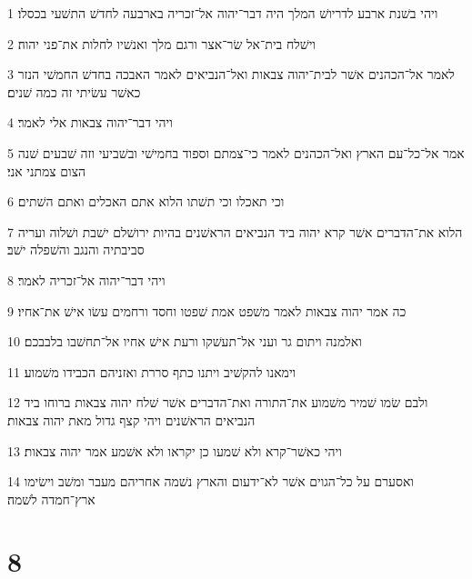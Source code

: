 \par 1 ויהי בשׁנת ארבע לדריושׁ המלך היה דבר־יהוה אל־זכריה בארבעה לחדשׁ התשׁעי בכסלו׃
\par 2 וישׁלח בית־אל שׂר־אצר ורגם מלך ואנשׁיו לחלות את־פני יהוה׃
\par 3 לאמר אל־הכהנים אשׁר לבית־יהוה צבאות ואל־הנביאים לאמר האבכה בחדשׁ החמשׁי הנזר כאשׁר עשׂיתי זה כמה שׁנים׃
\par 4 ויהי דבר־יהוה צבאות אלי לאמר׃
\par 5 אמר אל־כל־עם הארץ ואל־הכהנים לאמר כי־צמתם וספוד בחמישׁי ובשׁביעי וזה שׁבעים שׁנה הצום צמתני אני׃
\par 6 וכי תאכלו וכי תשׁתו הלוא אתם האכלים ואתם השׁתים׃
\par 7 הלוא את־הדברים אשׁר קרא יהוה ביד הנביאים הראשׁנים בהיות ירושׁלם ישׁבת ושׁלוה ועריה סביבתיה והנגב והשׁפלה ישׁב׃
\par 8 ויהי דבר־יהוה אל־זכריה לאמר׃
\par 9 כה אמר יהוה צבאות לאמר משׁפט אמת שׁפטו וחסד ורחמים עשׂו אישׁ את־אחיו׃
\par 10 ואלמנה ויתום גר ועני אל־תעשׁקו ורעת אישׁ אחיו אל־תחשׁבו בלבבכם׃
\par 11 וימאנו להקשׁיב ויתנו כתף סררת ואזניהם הכבידו משׁמוע׃
\par 12 ולבם שׂמו שׁמיר משׁמוע את־התורה ואת־הדברים אשׁר שׁלח יהוה צבאות ברוחו ביד הנביאים הראשׁנים ויהי קצף גדול מאת יהוה צבאות׃
\par 13 ויהי כאשׁר־קרא ולא שׁמעו כן יקראו ולא אשׁמע אמר יהוה צבאות׃
\par 14 ואסערם על כל־הגוים אשׁר לא־ידעום והארץ נשׁמה אחריהם מעבר ומשׁב וישׂימו ארץ־חמדה לשׁמה׃

\chapter{8}

